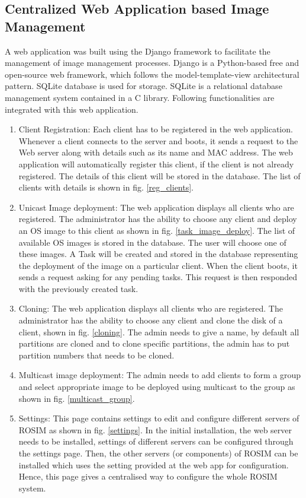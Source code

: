 \documentclass[a4paper,12pt]{article}
\begin{document}
\subsection{Centralized Web Application based Image Management}
A web application was built using the Django framework to facilitate the management of image management processes. Django is a Python-based free and open-source web framework, which follows the model-template-view architectural pattern. SQLite database is used for storage. SQLite is a relational database management system contained in a C library. Following  functionalities are integrated with this web application.
\begin{enumerate}[label=\roman*.]
     \item   Client Registration: Each client has to be registered in the web application. Whenever a client connects to the server and boots, it sends a request to the Web server along with details such as its name and MAC address. The web application will automatically register this client, if the client is not already registered. The details of this client will be stored in the database. The list of clients with details is shown in fig. \ref{reg_clients}.
    
    \item Unicast Image deployment: The web application displays all clients who are registered. The administrator has the ability to choose any client and deploy an OS image to this client as shown in fig. \ref{task_image_deploy}. The list of available OS images is stored in the database. The user will choose one of these images. A Task will be created and stored in the database representing the deployment of the image on a particular client. When the client boots, it sends a request asking for any pending tasks. This request is then responded with the previously created task.
    
    \item Cloning: The web application displays all clients who are registered. The administrator has the ability to choose any client and clone the disk of a client, shown in fig. \ref{cloning}. The admin needs to give a name, by default all partitions are cloned and to clone specific partitions, the admin has to put partition numbers that needs to be cloned.
    
    \item Multicast image deployment: The admin needs to add clients to form a group and select appropriate image to be deployed using multicast to the group as shown in fig. \ref{multicast_group}.
    
    \item Settings: This page contains settings to edit and configure different servers of ROSIM as shown in fig. \ref{settings}. In the initial installation, the web server needs to be installed, settings of different servers can be configured through the settings page. Then, the other servers (or components) of ROSIM can be installed which uses the setting provided at the web app for configuration. Hence, this page gives a centralised way to configure the whole ROSIM system.
    
    
\end{enumerate}
\end{document}
